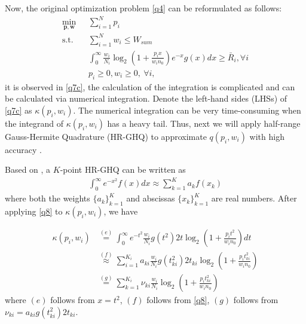 \documentclass[journal]{IEEEtran}
\begin{document}
Now, the original optimization problem \eqref{q4} can be reformulated as follows:
\begin{subequations}\label{q7}
	\begin{align}
	\min_{\mathbf{p}, \mathbf{w}}\ & \sum\limits_{i = 1}^{N} p_i \label{q7a} \\ \mbox{s.t.} \quad &  \sum\limits_{i = 1}^{N} w_i \leq W_{sum} \label{q7b} \\ \quad &  \int_{0}^{\infty} \frac{w_i}{N_i} \log_2\left(1 + \frac{p_i x}{w_i n_0}\right) e^{-x}g\left(x\right) dx \geq \bar{R}_i, \forall i \label{q7c}\\
	& p_i \geq 0, w_i \geq 0, \ \forall i, \label{q7d}
	\end{align}
\end{subequations}
it is observed in \eqref{q7c}, the calculation of the integration is complicated and can be calculated via numerical integration. Denote the left-hand sides (LHSs) of \eqref{q7c} as $\kappa\left(p_i, w_i\right)$. The numerical integration can be very time-consuming when the integrand of $\kappa\left(p_i, w_i\right)$ has a heavy tail. Thus, next we will apply half-range Gauss-Hermite Quadrature (HR-GHQ) to approximate $q\left(p_i, w_i\right)$ with high accuracy \cite{JSBall,NMSteen}.

Based on \cite{NMSteen}, a $K$-point HR-GHQ can be written as
\begin{align} \label{q8}
\int_{0}^{\infty}e^{-x^2} f\left(x\right) dx \approx \sum\limits_{k = 1}^{K} a_k f\left(x_k\right)
\end{align}
where both the weights $\{a_k\}_{k = 1}^K$ and abscissas $\{x_k\}_{k = 1}^K$ are real numbers. After applying \eqref{q8} to $\kappa \left(p_i, w_i\right)$, we have

\begin{align} \label{q9}
\kappa \left(p_i, w_i\right) &\overset{\left(e\right)}{=} \int_{0}^{\infty}e^{-t^2}\frac{w_i}{N_i} g\left(t^2\right) 2t \log_2\left(1 + \frac{p_it^2}{w_in_0}\right)dt  \nonumber \\
& \overset{\left(f\right)}{\approx} \sum\limits_{i = 1}^{K_i}a_{ki}\frac{w_i}{N_i}g\left(t_{ki}^2\right)2t_{ki}\log_2\left(1 + \frac{p_it_{ki}^2}{w_in_0}\right) \nonumber \\
& \overset{\left(g\right)}{=} \sum\limits_{k = 1}^{K_i}\nu_{ki}\frac{w_i}{N_i}\log_2\left(1 + \frac{p_it_{ki}^2}{w_in_0}\right)
\end{align}
where $\left(e\right)$ follows from $x = t^2$, $\left(f\right)$ follows from \eqref{q8}, $\left(g\right)$ follows from $\nu_{ki} = a_{ki}g\left(t_{ki}^2\right)2t_{ki}$.
\end{document}
